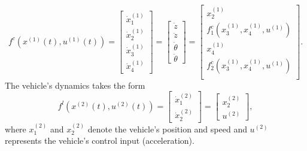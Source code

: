 \[f^{c}(x^{(1)}(t),u^{(1)}(t))=\begin{bmatrix}
	\dot{x}_1^{(1)}\\
	\dot{x}_2^{(1)}\\
	\dot{x}_3^{(1)}\\
	\dot{x}_4^{(1)}
\end{bmatrix}=\begin{bmatrix}
\dot{z}\\
\ddot{z}\\
\dot{\theta}\\
\ddot{\theta}
\end{bmatrix}=
\begin{bmatrix}
	x_2^{(1)}\\
	f^c_1(x_3^{(1)},x_4^{(1)},u^{(1)})\\
	x_4^{(1)}\\
	f^c_2(x_3^{(1)},x_4^{(1)},u^{(1)})\\
\end{bmatrix}.\]
The vehicle's dynamics takes the form
\[f^{l}(x^{(2)}(t),u^{(2)}(t))=\begin{bmatrix}
\dot{x}_1^{(2)}\\ \dot{x}^{(2)}_2 \end{bmatrix}=\begin{bmatrix} x^{(2)}_2\\ u^{(2)} \end{bmatrix},
\]
where $x_1^{(2)}$ and $x_2^{(2)}$ denote the vehicle's position and speed and $u^{(2)}$ represents the vehicle's control input (acceleration). %

